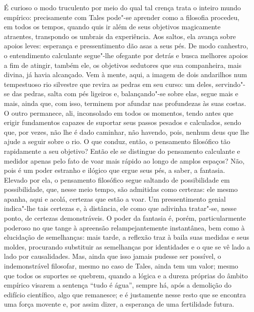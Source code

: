 É curioso o modo truculento por meio do qual tal crença trata o inteiro
mundo empírico: precisamente com Tales pode"-se aprender como a
filosofia procedeu, em todos os tempos, quando quis ir além de seus
objetivos magicamente atraentes, transpondo os umbrais da experiência.
Aos saltos, ela avança sobre apoios leves: esperança e pressentimento
dão asas a seus pés. De modo canhestro, o entendimento calculante
segue"-lhe ofegante por detrás e busca melhores apoios a fim de atingir,
também ele, os objetivos sedutores que sua companheira, mais divina, já
havia alcançado. Vem à mente, aqui, a imagem de dois andarilhos num
tempestuoso rio silvestre que revira as pedras em seu curso: um deles,
servindo"-se das pedras, salta com pés ligeiros e, balançando"-se sobre
elas, segue mais e mais, ainda que, com isso, terminem por afundar nas
profundezas às suas costas. O outro permanece, ali, inconsolado em todos
os momentos, tendo antes que erigir fundamentos capazes de suportar
seus passos pesados e calculados, sendo que, por vezes, não lhe é dado
caminhar, não havendo, pois, nenhum deus que lhe ajude a seguir sobre o
rio. O que conduz, então, o pensamento filosófico tão rapidamente a seu
objetivo? Então ele se distingue do pensamento calculante e medidor
apenas pelo fato de voar mais rápido ao longo de amplos espaços? Não, pois
é um poder estranho e ilógico que ergue seus pés, a saber, a fantasia.
Elevado por ela, o pensamento filosófico segue saltando de
possibilidade em possibilidade, que, nesse meio tempo, são admitidas
como certezas: ele mesmo apanha, aqui e acolá, certezas que estão a \label{certezasque}
voar. Um pressentimento genial indica"-lhe tais certezas e, à distância,
ele como que adivinha tratar"-se, nesse ponto, de certezas
demonstráveis. O poder da fantasia é, porém, particularmente poderoso
no que tange à apreensão relampejantemente instantânea, bem como à
elucidação de semelhanças: mais tarde, a reflexão traz à baila suas
medidas e seus moldes, procurando substituir as semelhanças por	\label{medidaseseusmoldes}
identidades e o que se vê lado a lado por causalidades. Mas, ainda que
isso jamais pudesse ser possível, o indemonstrável filosofar, mesmo no
caso de Tales, ainda tem um valor; mesmo que todos os suportes se
quebrem, quando a lógica e a dureza próprias do âmbito empírico
visarem a sentença ``tudo é água'', sempre há, após a demolição do
edifício científico, algo que remanesce; e é justamente nesse resto que
se encontra uma força movente e, por assim dizer, a esperança de uma fertilidade futura.

